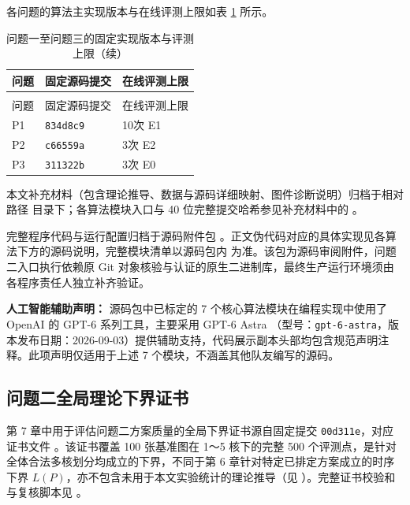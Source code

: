 \documentclass[anonymous,withtoc]{gmcm2026}
\begin{document}
各问题的算法主实现版本与在线评测上限如表 \ref{tab:appendix-1} 所示。



{\def\LTcaptype{table} %
\begin{longtable}[]{@{}lll@{}}
\caption{问题一至问题三的固定实现版本与评测上限}\label{tab:appendix-1}\\
\toprule\noalign{}
问题 & 固定源码提交 & 在线评测上限 \\
\midrule\noalign{}
\endfirsthead
\caption[]{问题一至问题三的固定实现版本与评测上限（续）}\\
\toprule\noalign{}
问题 & 固定源码提交 & 在线评测上限 \\
\midrule\noalign{}
\endhead
\bottomrule\noalign{}
\endlastfoot
P1 & \texttt{834d8c9} & 10次 E1 \\
P2 & \texttt{c66559a} & 3次 E2 \\
P3 & \texttt{311322b} & 3次 E0 \\
\end{longtable}
}

本文补充材料（包含理论推导、数据与源码详细映射、图件诊断说明）归档于相对路径 \texttt{} 目录下；各算法模块入口与 40 位完整提交哈希参见补充材料中的 \texttt{}。

完整程序代码与运行配置归档于源码附件包 \texttt{}。正文伪代码对应的具体实现见各算法下方的源码说明，完整模块清单以源码包内 \texttt{} 为准。该包为源码审阅附件，问题二入口执行依赖原 Git 对象核验与认证的原生二进制库，最终生产运行环境须由各程序责任人独立补齐验证。

\textbf{人工智能辅助声明：} 源码包中已标定的 7 个核心算法模块在编程实现中使用了 OpenAI 的 GPT-6 系列工具，主要采用 GPT-6 Astra \cite{openai-gpt6-astra}（型号：\texttt{gpt-6-astra}，版本发布日期：2026-09-03）提供辅助支持，代码展示副本头部均包含规范声明注释。此项声明仅适用于上述 7 个模块，不涵盖其他队友编写的源码。

\subsection{问题二全局理论下界证书}

第 7 章中用于评估问题二方案质量的全局下界证书源自固定提交 \texttt{00d311e}，对应证书文件 \texttt{}。该证书覆盖 100 张基准图在 1～5 核下的完整 500 个评测点，是针对全体合法多核划分均成立的下界，不同于第 6 章针对特定已排定方案成立的时序下界 \(L(P)\)，亦不包含未用于本文实验统计的理论推导（见 \texttt{}）。完整证书校验和与复核脚本见 \texttt{}。
\end{document}

